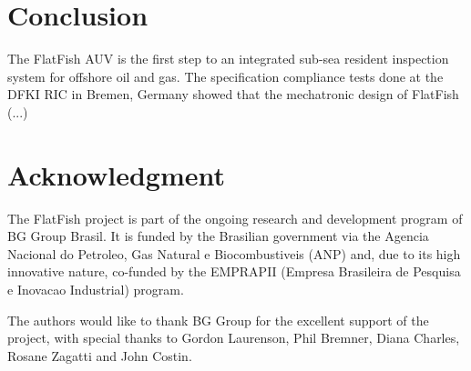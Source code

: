 \documentclass[conference]{IEEEtran}
\begin{document}
\section{Conclusion}

The FlatFish AUV is the first step to an integrated sub-sea resident inspection system for offshore oil and gas. The specification compliance tests done at the DFKI RIC in Bremen, Germany showed that the mechatronic design of FlatFish (...)






\section*{Acknowledgment}
The FlatFish project is part of the ongoing research and development program of BG Group Brasil. It is funded by the Brasilian government via the Agencia Nacional do Petroleo, Gas Natural e Biocombustiveis (ANP) and, due to its high innovative nature, co-funded by the EMPRAPII (Empresa Brasileira de Pesquisa e Inovacao Industrial) program. 

The authors would like to thank BG Group for the excellent support of the project, with special thanks to Gordon Laurenson, Phil Bremner, Diana Charles, Rosane Zagatti and John Costin.







\end{document}
